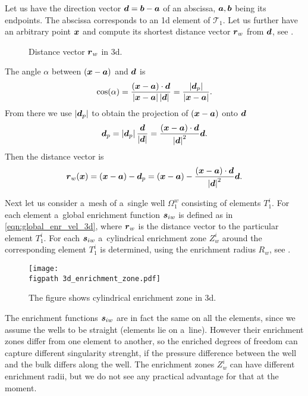 Let us have the direction vector $\mathbf{\boldsymbol{d}} = \mathbf{\boldsymbol{b}} - \mathbf{\boldsymbol{a}}$ of an abscissa, $\mathbf{\boldsymbol{a}}, \mathbf{\boldsymbol{b}}$ being its endpoints. 
The abscissa corresponds to an 1d element of $\mathcal{T}_1$.
Let us further have an arbitrary point $\mathbf{\boldsymbol{x}}$ and compute its 
shortest distance vector $\mathbf{\boldsymbol{r}}_w$ from $\mathbf{\boldsymbol{d}}$, see .
%
\begin{figure}[!htb]
  \vspace{5pt}
  \centering
  \def\svgwidth{0.5\textwidth}
  
  \caption{Distance vector $\mathbf{\boldsymbol{r}}_w$ in 3d.}
  \label{fig:distance_vector_3d}
\end{figure}
%
The angle $\alpha$ between $(\mathbf{\boldsymbol{x}} - \mathbf{\boldsymbol{a}})$ and $\mathbf{\boldsymbol{d}}$ is 
\[
\cos(\alpha) = \frac{(\mathbf{\boldsymbol{x}} - \mathbf{\boldsymbol{a}})\cdot\mathbf{\boldsymbol{d}}}{\left|\mathbf{\boldsymbol{x}} - \mathbf{\boldsymbol{a}}\right|\left|\mathbf{\boldsymbol{d}}\right|} = \frac{\left|\mathbf{\boldsymbol{d}}_p\right|}{\left|\mathbf{\boldsymbol{x}} - \mathbf{\boldsymbol{a}}\right|}.
\]
From there we use $\left|\mathbf{\boldsymbol{d}}_p\right|$ to obtain the projection of $(\mathbf{\boldsymbol{x}}-\mathbf{\boldsymbol{a}})$ onto $\mathbf{\boldsymbol{d}}$
\[
\mathbf{\boldsymbol{d}}_p = \left|\mathbf{\boldsymbol{d}}_p\right|\frac{\mathbf{\boldsymbol{d}}}{\left|\mathbf{\boldsymbol{d}}\right|} = \frac{(\mathbf{\boldsymbol{x}} - \mathbf{\boldsymbol{a}})\cdot\mathbf{\boldsymbol{d}}}{\left|\mathbf{\boldsymbol{d}}\right|^2} \mathbf{\boldsymbol{d}}.
\]
Then the distance vector is
\begin{equation} \label{eqn:distance_vector_in_3d}
  \mathbf{\boldsymbol{r}}_w(\mathbf{\boldsymbol{x}}) = (\mathbf{\boldsymbol{x}} - \mathbf{\boldsymbol{a}}) - \mathbf{\boldsymbol{d}}_p = (\mathbf{\boldsymbol{x}} - \mathbf{\boldsymbol{a}}) - \frac{(\mathbf{\boldsymbol{x}} - \mathbf{\boldsymbol{a}})\cdot\mathbf{\boldsymbol{d}}}{\left|\mathbf{\boldsymbol{d}}\right|^2} \mathbf{\boldsymbol{d}}.
\end{equation}

Next let us consider a~mesh of a~single well $\Omega^w_1$ consisting of elements $T^i_1$.
For each element a~global enrichment function $\mathbf{\boldsymbol{s}}_{iw}$ is defined as in \eqref{eqn:global_enr_vel_3d},
where $\mathbf{\boldsymbol{r}}_w$ is the distance vector to the particular element $T^i_1$.
For each $\mathbf{\boldsymbol{s}}_{iw}$ a~cylindrical enrichment zone $Z^i_w$ around the corresponding element $T^i_1$ is determined, 
using the enrichment radius $R_w$, see .
%
\begin{figure}[!htb]
    \centering    
    \texttt{[image: \\figpath 3d\_enrichment\_zone.pdf]} 
    \caption[enrichment zone in 3d]
  {The figure shows cylindrical enrichment zone in 3d.}
  \label{fig:enrichment_zone_in_3d}
\end{figure}
%
The enrichment functions $\mathbf{\boldsymbol{s}}_{iw}$ are in fact the same on all the elements,
since we assume the wells to be straight (elements lie on a~line). However their enrichment zones differ from one element to another,
so the enriched degrees of freedom can capture different singularity strenght, if the pressure difference between
the well and the bulk differs along the well.
The enrichment zones $Z^i_w$ can have different enrichment radii, but we do not see any practical advantage for that at the moment.

